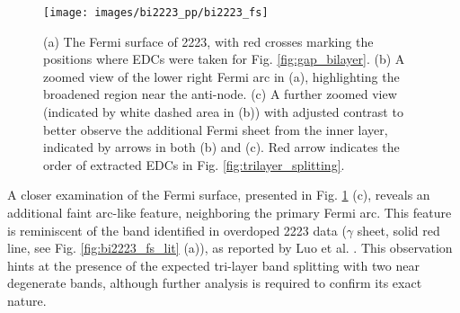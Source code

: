 \begin{figure}[t!]
	\centering
	\texttt{[image: images/bi2223\_pp/bi2223\_fs]}
	\caption{(a) The Fermi surface of 2223, with red crosses marking the positions where EDCs were taken for Fig. \ref{fig:gap_bilayer}. (b) A zoomed view of the lower right Fermi arc in (a), highlighting the broadened region near the anti-node. (c) A further zoomed view (indicated by white dashed area in (b)) with adjusted contrast to better observe the additional Fermi sheet from the inner  layer, indicated by arrows in both (b) and (c). Red arrow indicates the order of extracted EDCs in Fig. \ref{fig:trilayer_splitting}.}
	\label{fig:bi2223_fs}
\end{figure}


A closer examination of the Fermi surface, presented in Fig. \ref{fig:bi2223_fs} (c), reveals an additional faint arc-like feature, neighboring the primary Fermi arc.
This feature is reminiscent of the band identified in overdoped 2223 data ($\gamma$ sheet, solid red line, see Fig. \ref{fig:bi2223_fs_lit} (a)), as reported by Luo et al. \cite{luo_electronic_2023}.
This observation hints at the presence of the expected tri-layer band splitting with two near degenerate bands, although further analysis is required to confirm its exact nature.

